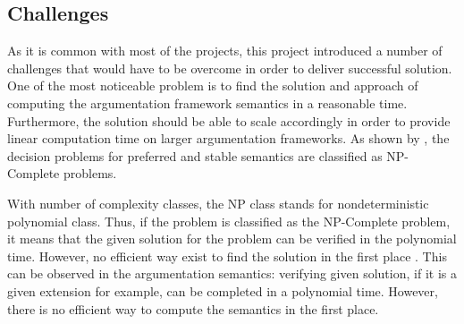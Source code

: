 \subsection{Challenges}
As it is common with most of the projects, this project introduced a number of challenges that would have to be overcome in order to deliver successful solution. One of the most noticeable problem is to find the solution and approach of computing the argumentation framework semantics in a reasonable time. Furthermore, the solution should be able to scale accordingly in order to provide linear computation time on larger argumentation frameworks. As shown by \citet{complexity}, the decision problems for preferred and stable semantics are classified as NP-Complete problems. 

With number of complexity classes, the NP class stands for nondeterministic polynomial class. Thus, if the problem is classified as the NP-Complete problem, it means that the given solution for the problem can be verified in the polynomial time. However, no efficient way exist to find the solution in the first place \citep{arora2009computational}. This can be observed in the argumentation semantics: verifying given solution, if it is a given extension for example, can be completed in a polynomial time. However, there is no efficient way to compute the semantics in the first place. 

